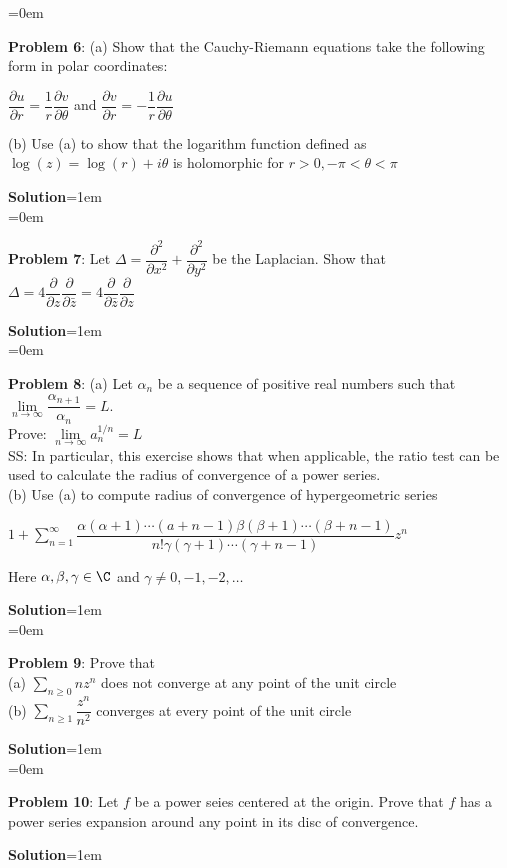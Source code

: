 \documentclass{article}
\begin{document}
\newpage\parskip=0em
\begin{mdframed}[backgroundcolor=blue!20]
\textbf{Problem 6}: (a) Show that the Cauchy-Riemann equations take the following form in polar coordinates: 
\begin{center}
    $\dfrac{\partial u}{\partial r} = \dfrac{1}{r}\dfrac{\partial v}{\partial \theta}$ and $\dfrac{\partial v}{\partial r} = -\dfrac{1}{r}\dfrac{\partial u}{\partial \theta}$
\end{center}
(b) Use (a) to show that the logarithm function defined as $\log(z) = \log(r) + i\theta$ is holomorphic for $r > 0, -\pi < \theta < \pi$
\end{mdframed}
\textbf{Solution}\parskip=1em\\

\newpage\parskip=0em
\begin{mdframed}[backgroundcolor=blue!20]
\textbf{Problem 7}: Let $\Delta = \dfrac{\partial^2}{\partial x^2} + \dfrac{\partial^2}{\partial y^2}$ be the Laplacian. Show that $\Delta = 4\dfrac{\partial}{\partial z}\dfrac{\partial}{\partial \bar{z}} = 4 \dfrac{\partial}{\partial \bar{z}}\dfrac{\partial}{\partial z}$
\end{mdframed}
\textbf{Solution}\parskip=1em\\

\newpage\parskip=0em
\begin{mdframed}[backgroundcolor=blue!20]
\textbf{Problem 8}: (a) Let $\alpha_n$ be a sequence of positive real numbers such that $\lim\limits_{n\to \infty} \dfrac{\alpha_{n+1}}{\alpha_n} = L.$\\ Prove: $\lim\limits_{n \to \infty} a_n^{1/n} = L$\\
SS: In particular, this exercise shows that when applicable, the ratio test can be used to calculate the radius of convergence of a power series.\\
(b) Use (a) to compute radius of convergence of hypergeometric series 
\begin{center}
    $1 + \sum\limits_{n = 1}^\infty \dfrac{\alpha(\alpha + 1)\cdots(a + n-1)\beta(\beta + 1)\cdots(\beta + n-1)}{n!\gamma(\gamma + 1)\cdots(\gamma + n - 1)}z^n$
\end{center}
Here $\alpha, \beta, \gamma \in \C$ and $\gamma \neq 0, -1, -2, \ldots$
\end{mdframed}
\textbf{Solution}\parskip=1em\\

\newpage\parskip=0em
\begin{mdframed}[backgroundcolor=blue!20]
\textbf{Problem 9}: Prove that\\
(a) $\sum\limits_{n \geq 0} nz^n$ does not converge at any point of the unit circle\\
(b) $\sum\limits_{n\geq 1}\dfrac{z^n}{n^2}$ converges at every point of the unit circle
\end{mdframed}
\textbf{Solution}\parskip=1em\\

\newpage\parskip=0em
\begin{mdframed}[backgroundcolor=blue!20]
\textbf{Problem 10}: Let $f$ be a power seies centered at the origin. Prove that $f$ has a power series expansion around any point in its disc of convergence.
\end{mdframed}
\textbf{Solution}\parskip=1em\\
\end{document}

